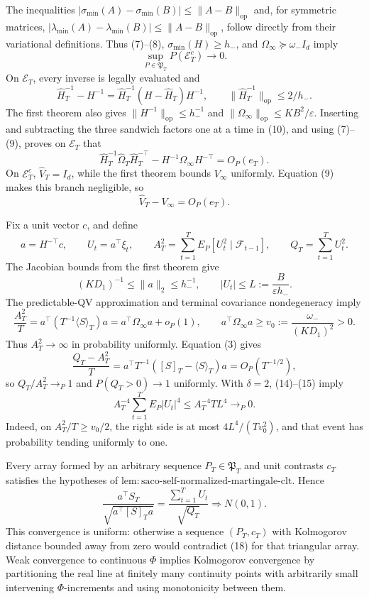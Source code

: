 The inequalities \(|\sigma_{\min}(A)-\sigma_{\min}(B)|\le\|A-B\|_{\mathrm{op}}\) and, for symmetric matrices, \(|\lambda_{\min}(A)-\lambda_{\min}(B)|\le\|A-B\|_{\mathrm{op}}\), follow directly from their variational definitions. Thus (7)--(8), \(\sigma_{\min}(H)\ge h_-\), and \(\Omega_\infty\succeq\omega_-I_d\) imply
\[
 \sup_{P\in\mathfrak P_T}P(\mathcal E_T^c)\longrightarrow0. \tag{9}
\]
On \(\mathcal E_T\), every inverse is legally evaluated and
\[
 \widehat H_T^{-1}-H^{-1}
 =\widehat H_T^{-1}(H-\widehat H_T)H^{-1},
 \qquad \|\widehat H_T^{-1}\|_{\mathrm{op}}\le2/h_-. \tag{10}
\]
The first theorem also gives \(\|H^{-1}\|_{\mathrm{op}}\le h_-^{-1}\) and \(\|\Omega_\infty\|_{\mathrm{op}}\le KB^2/\varepsilon\). Inserting and subtracting the three sandwich factors one at a time in (10), and using (7)--(9), proves on \(\mathcal E_T\) that
\[
 \widehat H_T^{-1}\widehat\Omega_T\widehat H_T^{-\top}
 -H^{-1}\Omega_\infty H^{-\top}=O_P(e_T). \tag{11}
\]
On \(\mathcal E_T^c\), \(\widehat V_T=I_d\), while the first theorem bounds \(V_\infty\) uniformly. Equation (9) makes this branch negligible, so
\[
 \widehat V_T-V_\infty=O_P(e_T). \tag{12}
\]

Fix a unit vector \(c\), and define
\[
 a=H^{-\top}c,\qquad U_t=a^\top\xi_t,\qquad
 A_T^2=\sum_{t=1}^TE_P[U_t^2\mid\mathcal F_{t-1}],\qquad
 Q_T=\sum_{t=1}^TU_t^2. \tag{13}
\]
The Jacobian bounds from the first theorem give
\[
 (KD_1)^{-1}\le\|a\|_2\le h_-^{-1},
 \qquad |U_t|\le L:=\frac{B}{\varepsilon h_-}. \tag{14}
\]
The predictable-QV approximation and terminal covariance nondegeneracy imply
\[
 \frac{A_T^2}{T}
 =a^\top(T^{-1}\langle S\rangle_T)a
 =a^\top\Omega_\infty a+o_P(1),
 \qquad a^\top\Omega_\infty a\ge v_0:=\frac{\omega_-}{(KD_1)^2}>0. \tag{15}
\]
Thus \(A_T^2\to\infty\) in probability uniformly. Equation (3) gives
\[
 \frac{Q_T-A_T^2}{T}
 =a^\top T^{-1}([S]_T-\langle S\rangle_T)a
 =O_P(T^{-1/2}), \tag{16}
\]
so \(Q_T/A_T^2\to_P1\) and \(P(Q_T>0)\to1\) uniformly. With \(\delta=2\), (14)--(15) imply
\[
 A_T^{-4}\sum_{t=1}^TE_P|U_t|^4
 \le A_T^{-4}TL^4\longrightarrow_P0. \tag{17}
\]
Indeed, on \(A_T^2/T\ge v_0/2\), the right side is at most \(4L^4/(Tv_0^2)\), and that event has probability tending uniformly to one.

Every array formed by an arbitrary sequence \(P_T\in\mathfrak P_T\) and unit contrasts \(c_T\) satisfies the hypotheses of \(\mathrm{lem:saco\text{-}self\text{-}normalized\text{-}martingale\text{-}clt}\). Hence
\[
 \frac{a^\top S_T}{\sqrt{a^\top[S]_Ta}}
 =\frac{\sum_{t=1}^TU_t}{\sqrt{Q_T}}\Rightarrow N(0,1). \tag{18}
\]
This convergence is uniform: otherwise a sequence \((P_T,c_T)\) with Kolmogorov distance bounded away from zero would contradict (18) for that triangular array. Weak convergence to continuous \(\Phi\) implies Kolmogorov convergence by partitioning the real line at finitely many continuity points with arbitrarily small intervening \(\Phi\)-increments and using monotonicity between them.

